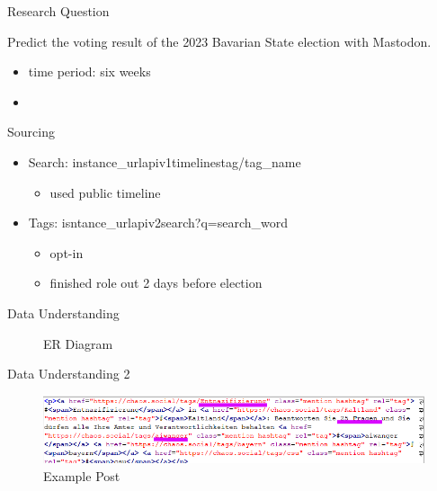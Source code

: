
\begin{frame}{Research Question}
	
	Predict the voting result of the 2023 Bavarian State election with Mastodon.
	
	\begin{itemize}
		\item time period: six weeks
		\item  
	\end{itemize}
	
\end{frame}

\begin{frame}{Sourcing}
	
	\begin{itemize}
		\item Search: {{instance\_url}}\/api\/v1\/timelines\/tag/{{tag\_name}}
		\begin{itemize}
			\item used public timeline
		\end{itemize}
		\item Tags: {{isntance\_url}}\/api\/v2\/search?q={{search\_word}}
		\begin{itemize}
			\item opt-in
			\item finished role out 2 days before election
		\end{itemize}
		
	\end{itemize}
\end{frame}

\begin{frame}{Data Understanding}
	
	\begin{figure}[htbp]
		\centering
		\resizebox{\columnwidth}{!}{}
		\caption{ER Diagram}
	\end{figure}
	
\end{frame}

\begin{frame}{Data Understanding 2}
	\begin{figure}[htbp]
		\centering
		\includegraphics[width=\linewidth]{pictures/example_posts.png}
		\caption{Example Post}
	\end{figure}
\end{frame}

